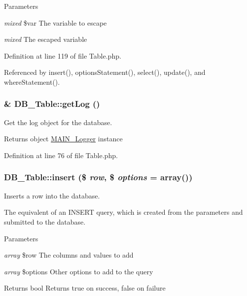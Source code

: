 \begin{DoxyParams}{Parameters}
\item[{\em mixed}]\$var The variable to escape\item[{\em mixed}]The escaped variable \end{DoxyParams}


Definition at line 119 of file Table.php.

Referenced by insert(), optionsStatement(), select(), update(), and whereStatement().\hypertarget{classDB__Table_a3c86c1069485a5bdff2e4152b8485443}{
\subsubsection[{getLog}]{\setlength{\rightskip}{0pt plus 5cm}\& DB\_\-Table::getLog ()}}
\label{d6/d90/classDB__Table_a3c86c1069485a5bdff2e4152b8485443}
Get the log object for the database.

\begin{DoxyReturn}{Returns}
object \hyperlink{classMAIN__Logger}{MAIN\_\-Logger} instance 
\end{DoxyReturn}


Definition at line 76 of file Table.php.\hypertarget{classDB__Table_a843dcb7cc2f8eac5865d05de68d9c0bf}{
\subsubsection[{insert}]{\setlength{\rightskip}{0pt plus 5cm}DB\_\-Table::insert (\$ {\em row}, \/  \$ {\em options} = {\ttfamily array()})}}
\label{d6/d90/classDB__Table_a843dcb7cc2f8eac5865d05de68d9c0bf}
Inserts a row into the database.

The equivalent of an INSERT query, which is created from the parameters and submitted to the database.


\begin{DoxyParams}{Parameters}
\item[{\em array}]\$row The columns and values to add \item[{\em array}]\$options Other options to add to the query\end{DoxyParams}
\begin{DoxyReturn}{Returns}
bool Returns true on success, false on failure 
\end{DoxyReturn}


